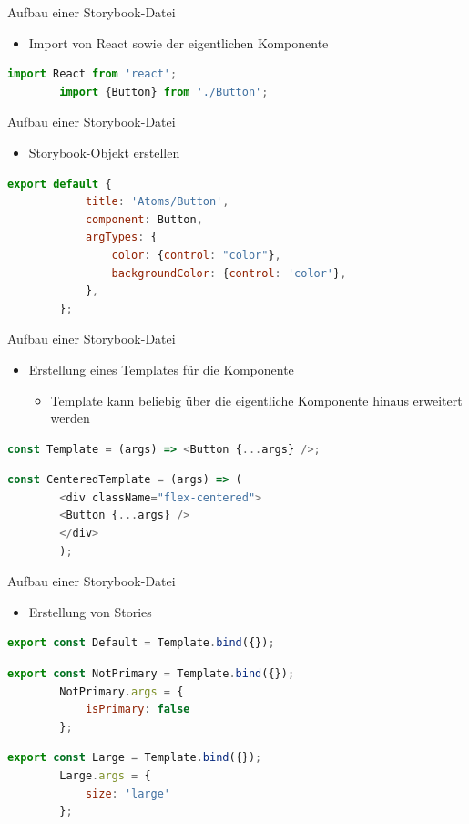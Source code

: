 \documentclass{beamer}
\begin{document}
\begin{frame}[fragile]{Aufbau einer Storybook-Datei}
	\begin{itemize}
		\item Import von React sowie der eigentlichen Komponente
	\end{itemize}
	\begin{lstlisting}[language=JavaScript]
		import React from 'react';
		import {Button} from './Button';
	\end{lstlisting}		
\end{frame}

\begin{frame}[fragile]{Aufbau einer Storybook-Datei}
	\begin{itemize}
		\item Storybook-Objekt erstellen
	\end{itemize}
	\begin{lstlisting}[language=JavaScript]
		export default {
			title: 'Atoms/Button',
			component: Button,
			argTypes: {
				color: {control: "color"},
				backgroundColor: {control: 'color'},
			},
		};
	\end{lstlisting}
\end{frame}

\begin{frame}[fragile]{Aufbau einer Storybook-Datei}
	\begin{itemize}
		\item Erstellung eines Templates für die Komponente
		\begin{itemize}
			\item Template kann beliebig über die eigentliche Komponente hinaus erweitert werden
		\end{itemize}
	\end{itemize}
	\begin{lstlisting}[language=JavaScript]
		const Template = (args) => <Button {...args} />;
	\end{lstlisting}
	\begin{lstlisting}[language=JavaScript]
		const CenteredTemplate = (args) => (
		<div className="flex-centered">
		<Button {...args} />
		</div>
		);
	\end{lstlisting}
\end{frame}

\begin{frame}[fragile]{Aufbau einer Storybook-Datei}
	\begin{itemize}
		\item Erstellung von Stories
	\end{itemize}
	\begin{lstlisting}[language=JavaScript]
		export const Default = Template.bind({});
	\end{lstlisting}
	\begin{lstlisting}[language=JavaScript]
		export const NotPrimary = Template.bind({});
		NotPrimary.args = {
			isPrimary: false
		};
	\end{lstlisting}
	\begin{lstlisting}[language=JavaScript]
		export const Large = Template.bind({});
		Large.args = {
			size: 'large'
		};
	\end{lstlisting}
\end{frame}
\end{document}

